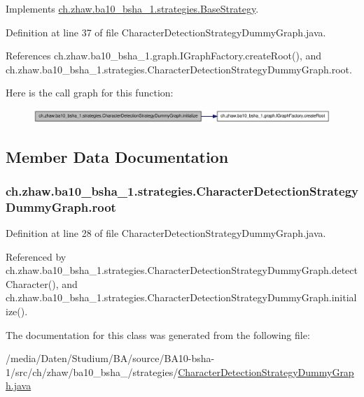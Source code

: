Implements \hyperlink{classch_1_1zhaw_1_1ba10__bsha__1_1_1strategies_1_1BaseStrategy_af6ea27835befac71906915236a347450}{ch.zhaw.ba10\_\-bsha\_\-1.strategies.BaseStrategy}.

Definition at line 37 of file CharacterDetectionStrategyDummyGraph.java.

References ch.zhaw.ba10\_\-bsha\_\-1.graph.IGraphFactory.createRoot(), and ch.zhaw.ba10\_\-bsha\_\-1.strategies.CharacterDetectionStrategyDummyGraph.root.

Here is the call graph for this function:\nopagebreak
\begin{figure}[H]
\begin{center}
\leavevmode
\includegraphics[width=358pt]{classch_1_1zhaw_1_1ba10__bsha__1_1_1strategies_1_1CharacterDetectionStrategyDummyGraph_a5e2ad376333d4f59481d0600fec019f0_cgraph}
\end{center}
\end{figure}


\subsection{Member Data Documentation}
\hypertarget{classch_1_1zhaw_1_1ba10__bsha__1_1_1strategies_1_1CharacterDetectionStrategyDummyGraph_a734b7506e0104434524a5cb0db0ad7d4}{
\subsubsection[{root}]{ {\bf ch.zhaw.ba10\_\-bsha\_\-1.strategies.CharacterDetectionStrategyDummyGraph.root}}}
\label{classch_1_1zhaw_1_1ba10__bsha__1_1_1strategies_1_1CharacterDetectionStrategyDummyGraph_a734b7506e0104434524a5cb0db0ad7d4}


Definition at line 28 of file CharacterDetectionStrategyDummyGraph.java.

Referenced by ch.zhaw.ba10\_\-bsha\_\-1.strategies.CharacterDetectionStrategyDummyGraph.detectCharacter(), and ch.zhaw.ba10\_\-bsha\_\-1.strategies.CharacterDetectionStrategyDummyGraph.initialize().

The documentation for this class was generated from the following file:\begin{DoxyCompactItemize}
\item 
/media/Daten/Studium/BA/source/BA10-\/bsha-\/1/src/ch/zhaw/ba10\_\-bsha\_/strategies/\hyperlink{CharacterDetectionStrategyDummyGraph_8java}{CharacterDetectionStrategyDummyGraph.java}\end{DoxyCompactItemize}
